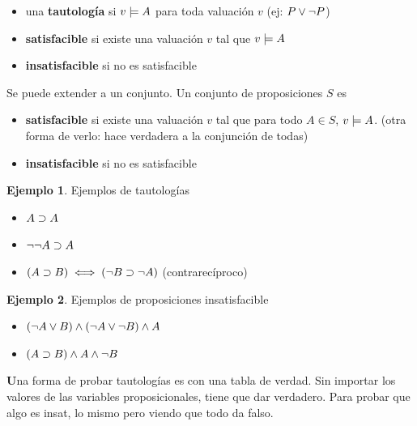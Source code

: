 \documentclass{report}
\theoremstyle{definition} %
\newtheorem*{example*}{Ejemplo}
\newenvironment{nota}[1]
    {\begin{leftbar}\textbf{#1}}
    {\end{leftbar}}
\begin{document}
\begin{itemize}
    \item una \textbf{tautología} si $v \models A$ para toda valuación $v$ 
    (ej: $P \vee \neg P$)
    \item \textbf{satisfacible} si existe una valuación $v$ tal que $v \models A$
    \item \textbf{insatisfacible} si no es satisfacible
\end{itemize}

Se puede extender a un conjunto. Un conjunto de proposiciones $S$ es 

\begin{itemize}
    \item \textbf{satisfacible} si existe una valuación $v$ tal que para todo $A
    \in S$, $v \models A$. (otra forma de verlo: hace verdadera a la conjunción
    de todas)
    \item \textbf{insatisfacible} si no es satisfacible
\end{itemize}

\begin{example*}
    Ejemplos de tautologías
    \begin{itemize}
        \item $A \supset A$
        \item $\neg \neg A \supset A$
        \item $(A \supset B) \iff (\neg B \supset \neg A)$ (contrarecíproco)
    \end{itemize}
    
\end{example*}

\begin{example*} Ejemplos de proposiciones insatisfacible
    \begin{itemize}
        \item $(\neg A \vee B) \wedge (\neg A \vee \neg B) \wedge A$
        \item \(
            \y
                {(\impl{A}{B})}
                {\y
                {A}
                {\no{B}}
                }
        \)
    \end{itemize}
\end{example*}

\begin{nota}
    Una forma de probar tautologías es con una tabla de verdad. Sin importar los
    valores de las variables proposicionales, tiene que dar verdadero. Para
    probar que algo es insat, lo mismo pero viendo que todo da falso.
\end{nota}
\end{document}
